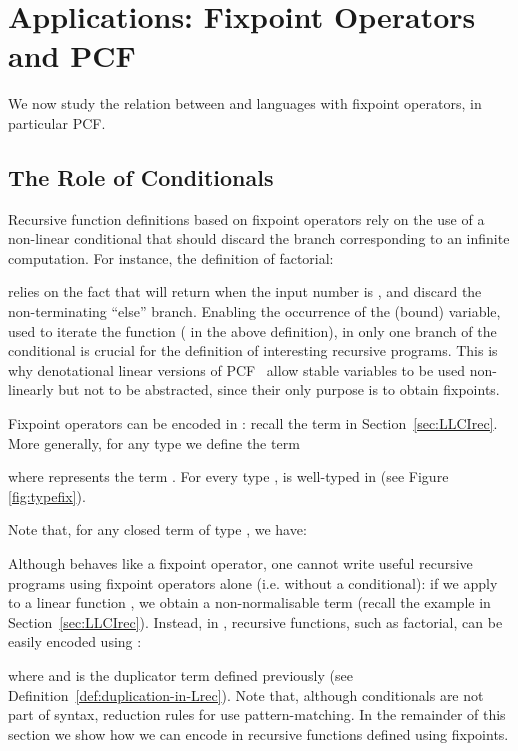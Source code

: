 \documentclass{article}
\begin{document}
\section{Applications:  Fixpoint Operators and PCF}
\label{sec:PCF}


We now study the relation between  and languages with 
fixpoint operators, in particular PCF.


\subsection{The Role of Conditionals}

Recursive function definitions based on fixpoint operators
rely on the use of a non-linear conditional that should
discard the branch corresponding to an infinite computation.  For
instance, the definition of factorial:

relies on the fact that  will return  when the input
number is , and discard the non-terminating ``else'' branch.
Enabling the occurrence of the (bound) variable, used to iterate the
function ( in the above definition), in only one branch of the
conditional is crucial for the definition of interesting recursive
programs. This is why denotational linear versions of
PCF~\cite{paolini08ppdp} allow stable variables to be used non-linearly
but not to be abstracted, since their only purpose is to obtain
fixpoints.

Fixpoint operators can be encoded in \LLCIrec:
recall the term  in Section~\ref{sec:LLCIrec}. More
generally,
 for any type  we define the term

where  represents the term
.
For every type ,  is well-typed in
\LLCIrec (see Figure \ref{fig:typefix}).
\begin{figure*}

\caption{Type derivation for }\label{fig:typefix}
\end{figure*}
Note that, for any closed term  of type , we have:

Although  behaves like a fixpoint operator, one cannot write
useful recursive programs using fixpoint operators alone (i.e. without
a conditional): if we apply  to a linear function , we obtain
a non-normalisable term (recall the example in
Section~\ref{sec:LLCIrec}).  Instead, in \LLCIrec, recursive
functions, such as factorial, can be easily encoded using
:

where   and  is
the duplicator term defined previously (see
Definition~\ref{def:duplication-in-Lrec}).  Note that, although
conditionals are not part of \LLCIrec syntax, reduction rules for
 use pattern-matching.  In the remainder of this
section we show how we can encode in \LLCIrec recursive functions
defined using fixpoints.
\end{document}

